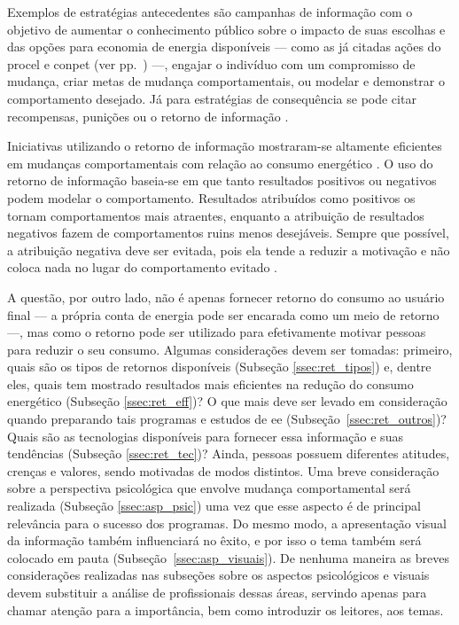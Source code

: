 Exemplos de estratégias antecedentes são campanhas de informação
com o objetivo de aumentar o conhecimento público sobre o impacto de suas
escolhas e das opções para economia de energia disponíveis --- como
as já citadas ações do \gls{procel} e \gls{conpet} (ver pp.~\pageref{text:prog_cepel}) ---,
engajar o indivíduo com um compromisso de mudança, criar metas de mudança
comportamentais, ou modelar e demonstrar o comportamento desejado. Já para
estratégias de consequência se pode citar recompensas, punições ou o
retorno de informação \cite{aceee_2010_estudos_feedback,2009_epri}.

Iniciativas utilizando o retorno de informação mostraram-se altamente eficientes
em mudanças comportamentais com relação ao consumo energético \cite{
aceee_2010_estudos_feedback,2009_epri,2012_schleich__austria,
2011_zhifeng_smart_energy_savings,2006_darby,2009_nber_studies_us,
ucla_studies_1975_2011_usa,2010_nilm_melhorando_pph_usa_37}. O uso do
retorno de informação baseia-se em que tanto resultados positivos ou
negativos podem modelar o comportamento. Resultados atribuídos como
positivos os tornam comportamentos mais atraentes, enquanto a
atribuição de resultados negativos fazem de comportamentos ruins
menos desejáveis. Sempre que possível, a atribuição negativa deve ser
evitada, pois ela tende a reduzir a motivação e não coloca nada no
lugar do comportamento evitado \cite{2010_aspectos_psicologicos_usa}.

A questão, por outro lado, não é apenas fornecer retorno do consumo ao usuário
final --- a própria conta de energia pode ser encarada como um meio de retorno
---, mas como o retorno pode ser utilizado para efetivamente motivar pessoas
para reduzir o seu consumo. Algumas considerações devem ser tomadas: primeiro,
quais são os tipos de retornos disponíveis (Subseção \ref{ssec:ret_tipos}) e,
dentre eles, quais tem mostrado resultados mais eficientes na redução do
consumo energético (Subseção \ref{ssec:ret_eff})? O que mais deve ser levado
em consideração quando preparando tais programas e estudos de \gls{ee}
(Subseção~\ref{ssec:ret_outros})? Quais são as tecnologias disponíveis para
fornecer essa informação e suas tendências (Subseção \ref{ssec:ret_tec})?
Ainda, pessoas possuem diferentes atitudes, crenças e valores, sendo motivadas
de modos distintos. Uma breve consideração sobre a perspectiva psicológica que
envolve mudança comportamental será realizada (Subseção \ref{ssec:asp_psic})
uma vez que esse aspecto é de principal relevância para o sucesso dos
programas.  Do mesmo modo, a apresentação visual da informação também
influenciará no êxito, e por isso o tema também será colocado em pauta
(Subseção~\ref{ssec:asp_visuais}). De nenhuma maneira as breves considerações
realizadas nas subseções sobre os aspectos psicológicos e visuais devem
substituir a análise de profissionais dessas áreas, servindo apenas para chamar
atenção para a importância, bem como introduzir os leitores, aos temas.

